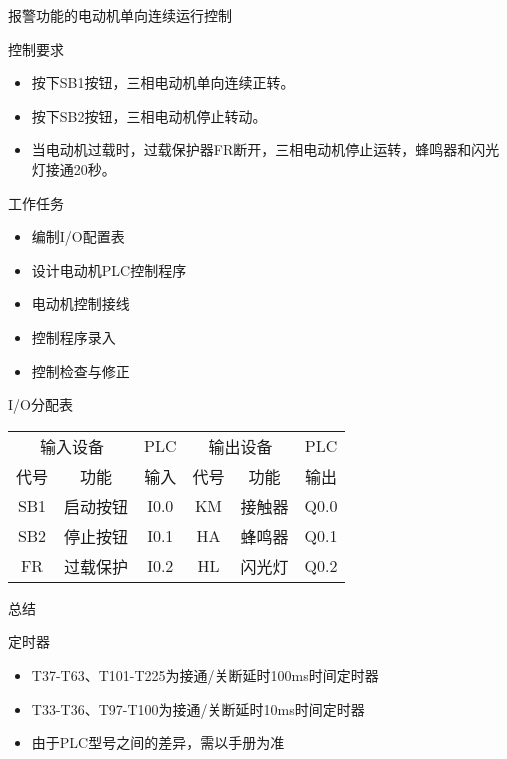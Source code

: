 \begin{frame}[containsverbatim]{报警功能的电动机单向连续运行控制}
\begin{block}{控制要求}
\begin{itemize}
\item 按下SB1按钮，三相电动机单向连续正转。
\item 按下SB2按钮，三相电动机停止转动。
\item 当电动机过载时，过载保护器FR断开，三相电动机停止运转，蜂鸣器和闪光灯接通20秒。
\end{itemize}
\end{block}
\end{frame}
\begin{frame}{}
\begin{block}{工作任务}
\begin{itemize}
\item 编制I/O配置表
\item 设计电动机PLC控制程序
\item 电动机控制接线
\item 控制程序录入
\item 控制检查与修正
\end{itemize}
\end{block}
\end{frame}
\begin{frame}
\begin{block}{I/O分配表}
\begin{small}
\begin{tabular}{|c|c|c|c|c|c|}
\hline 
\multicolumn{2}{|c|}{输入设备} & PLC &\multicolumn{2}{|c|}{输出设备} & PLC \\ 
\cline{1-2}\cline{4-5}
代号 & 功能 & 输入 & 代号 & 功能 & 输出 \\ 
\hline 
SB1 & 启动按钮 & I0.0 & KM & 接触器 & Q0.0 \\ 
\hline 
SB2 & 停止按钮 & I0.1 & HA & 蜂鸣器 & Q0.1 \\ 
\hline 
FR & 过载保护 & I0.2 &  HL & 闪光灯 & Q0.2 \\ 
\hline
\end{tabular} 
\end{small}
\end{block}
\end{frame}
\begin{frame}{总结}
\begin{block}{定时器}
\begin{itemize}
\item T37-T63、T101-T225为接通/关断延时100ms时间定时器
\item T33-T36、T97-T100为接通/关断延时10ms时间定时器
\item 由于PLC型号之间的差异，需以手册为准
\end{itemize}

\end{block}
\end{frame}
\endinput